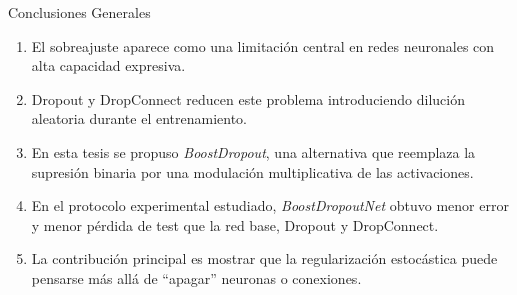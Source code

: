 \documentclass[aspectratio=169,11pt]{beamer}
\newcommand{\model}[1]{\textit{#1}}
\newcommand{\bd}{\model{BoostDropout}}
\newcommand{\bdn}{\model{BoostDropoutNet}}
\begin{document}
\begin{frame}{Conclusiones Generales}
\large
\begin{enumerate}
  \item El sobreajuste aparece como una limitación central en redes neuronales con alta capacidad expresiva.

  \vspace{0.15cm}

  \item Dropout y DropConnect reducen este problema introduciendo dilución aleatoria durante el entrenamiento.

  \vspace{0.15cm}

  \item En esta tesis se propuso \bd{}, una alternativa que reemplaza la supresión binaria por una modulación multiplicativa de las activaciones.

  \vspace{0.15cm}

  \item En el protocolo experimental estudiado, \bdn{} obtuvo menor error y menor pérdida de test que la red base, Dropout y DropConnect.

  \vspace{0.15cm}

  \item La contribución principal es mostrar que la regularización estocástica puede pensarse más allá de ``apagar'' neuronas o conexiones.
\end{enumerate}

\end{frame}
\end{document}
